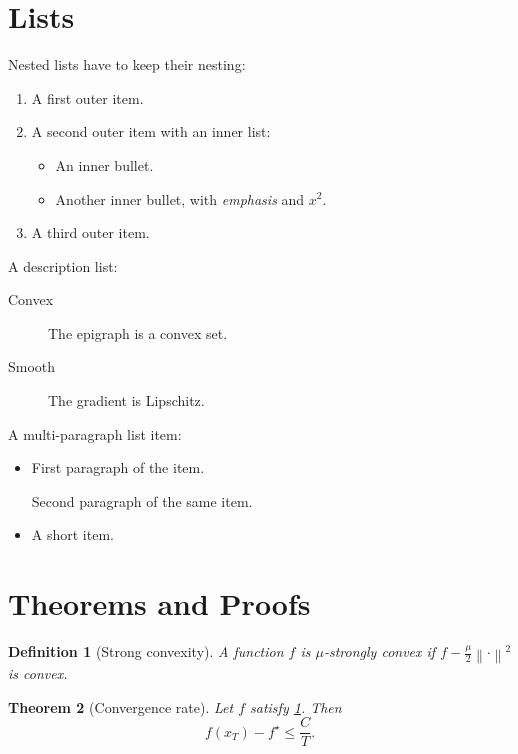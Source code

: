 \documentclass[11pt,twoside]{article}
\newtheorem{theorem}{Theorem}[section]
\newtheorem{definition}[theorem]{Definition}
\newcommand{\norm}[1]{\left\lVert#1\right\rVert}
\begin{document}
\section{Lists}
\label{sec:lists}

Nested lists have to keep their nesting:

\begin{enumerate}[label=(\roman*)]
  \item A first outer item.
  \item A second outer item with an inner list:
    \begin{itemize}
      \item An inner bullet.
      \item Another inner bullet, with \emph{emphasis} and $x^2$.
    \end{itemize}
  \item A third outer item.
\end{enumerate}

A description list:

\begin{description}
  \item[Convex] The epigraph is a convex set.
  \item[Smooth] The gradient is Lipschitz.
\end{description}

A multi-paragraph list item:

\begin{itemize}
  \item First paragraph of the item.

    Second paragraph of the same item.
  \item A short item.
\end{itemize}

\section{Theorems and Proofs}
\label{sec:theorems}

\begin{definition}[Strong convexity]
  \label{def:strong}
  A function $f$ is $\mu$-strongly convex if $f - \tfrac{\mu}{2}\norm{\cdot}^2$
  is convex.
\end{definition}

\begin{theorem}[Convergence rate]
  \label{thm:rate}
  Let $f$ satisfy \cref{def:strong}. Then
  \begin{equation}
    \label{eq:rate}
    f(x_T) - f^\star \le \frac{C}{T} .
  \end{equation}
\end{theorem}
\end{document}
